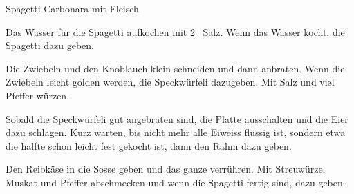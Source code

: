 
\begin{recipe}[]{Spagetti Carbonara mit Fleisch}{}{}



\step%
Das Wasser f\"ur die Spagetti aufkochen mit 2 \EL~Salz. Wenn das Wasser kocht,
die Spagetti dazu geben.

\step%
Die Zwiebeln und den Knoblauch klein schneiden und dann anbraten. Wenn die
Zwiebeln leicht golden werden, die Speckw\"urfeli dazugeben. Mit Salz und viel
Pfeffer w\"urzen.

\step%
Sobald die Speckw\"urfeli gut angebraten sind, die Platte ausschalten und die
Eier dazu schlagen. Kurz warten, bis nicht mehr alle Eiweiss fl\"ussig ist,
sondern etwa die h\"alfte schon leicht fest gekocht ist, dann den Rahm dazu
geben.

\step%
Den Reibk\"ase in die Sosse geben und das ganze verr\"uhren. Mit Streuw\"urze,
Muskat und Pfeffer abschmecken und wenn die Spagetti fertig sind, dazu geben.


\end{recipe}
